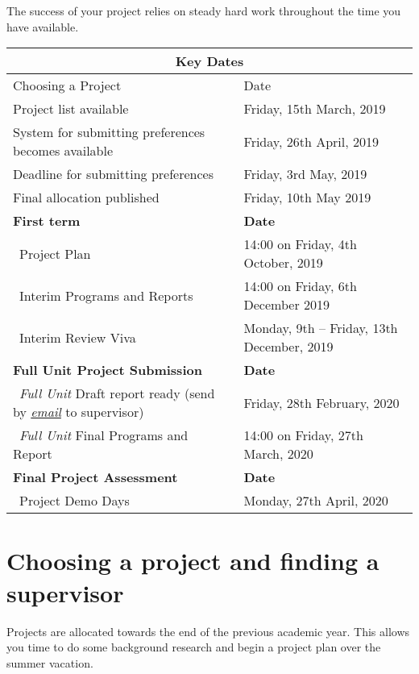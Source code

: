 \documentclass[11pt]{article}
\newcommand{\projlistdate}{Friday, 15th March, 2019}
\newcommand{\ballotStartdate}{Friday, 26th April, 2019}
\newcommand{\ballotClosedate}{Friday, 3rd May, 2019}
\newcommand{\finaldate}{Friday, 10th May 2019}
\newcommand{\demos}{Monday, 27th April, 2020}
\newcommand{\projectPlanSubmissionDate}{14:00 on Friday, 4th October, 2019}
\newcommand{\reviewSubmissiondate}{14:00 on Friday, 6th December 2019} %
\newcommand{\reviewVivadate}{Monday, 9th -- Friday, 13th December, 2019} %
\newcommand{\draftSubmissionDate}{Friday, 28th February, 2020} %
\newcommand{\submissiondate}{14:00 on Friday, 27th March, 2020}%
\newcommand{\planweight}{5\% }
\newcommand{\reportweight}{30\% }
\newcommand{\demoweight}{5\% }
\newcommand{\interimreportweight}{10\% }
\newcommand{\interimtechnicalweight}{10\% }
\newcommand{\vivaweight}{5\% }
\begin{document}
The success of your project relies on steady hard work throughout the time you have available.

\vspace*{2cm}
\begin{tabular}{||l|l||}
\hline
\hline
\multicolumn{2}{||c||}{\large \textbf{Key Dates}}\\
\hline
Choosing a Project & Date\\%
\hline
Project list available  & \projlistdate\\
System for submitting preferences becomes available&\ballotStartdate\\
Deadline for submitting preferences &\ballotClosedate\\
Final allocation published &\finaldate\\
\hline
\textbf{First term} & \textbf{Date} \\%
\hline
\ Project Plan & \projectPlanSubmissionDate \\%
\ Interim Programs and Reports  & \reviewSubmissiondate \\%
\ Interim Review Viva& \reviewVivadate \\%
\hline
\textbf{Full Unit Project Submission }& \textbf{Date} \\%
\hline
\ \emph{Full Unit} Draft report ready ({\footnotesize send by \textit{\uline{email}} to supervisor})& \draftSubmissionDate \\%
\ \emph{Full Unit} Final Programs and Report & \submissiondate \\%
\hline
\textbf{Final Project Assessment }& \textbf{Date} \\%
\hline
\ Project Demo Days& \demos \\%
\hline
\hline
\end{tabular}
\newpage

\section{Choosing a project and finding a supervisor}
Projects are allocated towards the end of the previous academic year.  This allows you time to do some background research and begin a project plan over the summer vacation.
\end{document}
